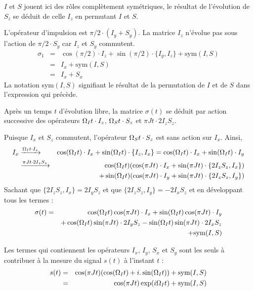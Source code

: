 $I$ et $S$ jouent ici des rôles complètement symétriques, le résultat de l'évolution de $S_z$ se 
déduit de celle $I_z$ en permutant $I$ et $S$.

L'opérateur d'impulsion est $\pi/2 \cdot (I_y + S_y)$. 
La matrice $I_z$ n'évolue pas sous l'action de $\pi/2 \cdot S_y$ 
car $I_z$ et $S_y$ commutent. 
\begin{eqnarray}
\sigma_1 & = & \cos(\pi/2) \cdot I_z + 
\sin(\pi/2) \cdot \{I_y,I_z\} + \mbox{sym}(I,S) \\
         & = & I_x + \mbox{sym}(I,S) \\
	 & = & I_x + S_x
\end{eqnarray}
La notation sym$(I,S)$ signifiant le résultat de la permutation de 
$I$ et de $S$ dans l'expression qui précède.

Après un temps $t$ d'évolution libre, 
la matrice $\sigma(t)$ se déduit par action successive 
des opérateurs $\Omega_I t \cdot I_z$, $\Omega_S t \cdot S_z$ 
et $\pi J t \cdot 2I_zS_z$.

Puisque $I_x$ et $S_z$ commutent, l'opérateur 
$\Omega_S t \cdot S_z$ est sans action sur $I_x$.
Ainsi,
\begin{eqnarray}
I_x & \xrightarrow{\Omega_I t \cdot I_z} &
\cos(\Omega_I t) \cdot I_x + 
\sin(\Omega_I t) \cdot \{I_z, I_x\} = 
\cos(\Omega_I t) \cdot I_x + \sin(\Omega_I t) \cdot I_y \nonumber\\
& \xrightarrow{\pi J t \cdot 2I_zS_z} & 
\cos(\Omega_I t) 
(\cos(\pi J t) \cdot I_x + \sin(\pi J t) \cdot \{2I_zS_z, I_x\}) \nonumber\\
& & +\sin(\Omega_I t) 
(\cos(\pi J t) \cdot I_y + \sin(\pi J t) \cdot \{2I_zS_z, I_y\})
\end{eqnarray}
Sachant que $\{2I_zS_z, I_x\} = 2I_yS_z$ et que $\{2I_zS_z, I_y\} = -2I_xS_z$
et en développant tous les termes :
\begin{eqnarray}
\sigma(t) & = & \cos(\Omega_I t) \cos(\pi J t) \cdot I_x
+ \sin(\Omega_I t) \cos(\pi J t) \cdot I_y \nonumber\\
&  & + \cos(\Omega_I t) \sin(\pi J t) \cdot 2I_yS_z
- \sin(\Omega_I t) \sin(\pi J t) \cdot 2I_xS_z \nonumber\\
\label{eqn:evolix-is}&  & + \mbox{sym}(I,S)
\end{eqnarray}

Les termes qui contiennent les opérateurs $I_x$, $I_y$, $S_x$ et $S_y$
sont les seuls à contribuer à la mesure du signal $s(t)$
à l'instant $t$ :
\begin{eqnarray}
s(t) & = & \cos(\pi J t) 
(\cos(\Omega_I t) + i.\sin(\Omega_I t)) + \mbox{sym}(I,S) \\
& = & \cos(\pi J t) \exp(i \Omega_I t) + \mbox{sym}(I,S)
\end{eqnarray}

